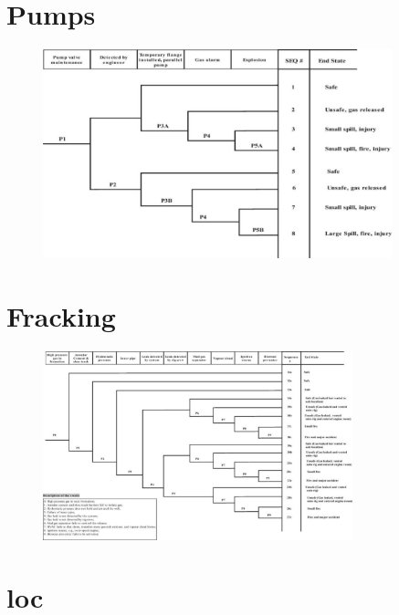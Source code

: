 \documentclass[aspectratio=1610,pdftex,dvipsnames,compress,xcolor={dvipsnames}]{beamer}
\newcommand{\acs}{\acrshort} %
\begin{document}
\section{Pumps}


\addtocounter{framenumber}{-1}
\begin{frame}{}
    \begin{figure}
        \centering
        \includegraphics[width=0.90\textwidth]{event.tree_pump.valve.jpg}
    \end{figure}
\end{frame}


\section{Fracking}


\addtocounter{framenumber}{-1}
\begin{frame}{}
    \begin{figure}
        \centering
        \includegraphics[width=0.80\textwidth]{event.tree_gas.jpg}
    \end{figure}
\end{frame}


\section{\acs{loc}}
\end{document}
